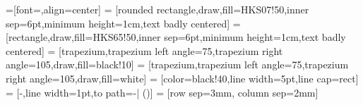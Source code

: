 \usetikzlibrary{chains,scopes,shapes.geometric,shapes.misc}
=[font=\sffamily,align=center]
 = [rounded rectangle,draw,fill=HKS07!50,inner sep=6pt,minimum height=1cm,text badly centered]
 = [rectangle,draw,fill=HKS65!50,inner sep=6pt,minimum height=1cm,text badly centered]
 = [trapezium,trapezium left angle=75,trapezium right angle=105,draw,fill=black!10]
 = [trapezium,trapezium left angle=75,trapezium right angle=105,draw,fill=white]
 = [color=black!40,line width=5pt,line cap=rect]
 = [-,line width=1pt,to path={-| (\tikztotarget)}]
 = [row sep=3mm, column sep=2mm]
